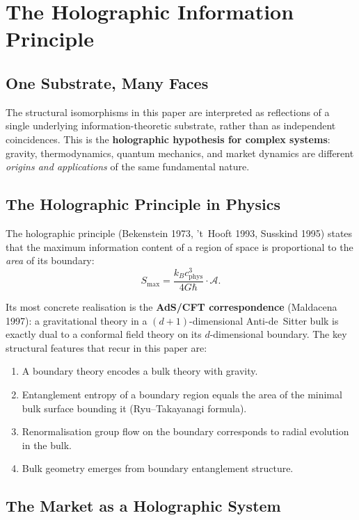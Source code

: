 \documentclass[12pt,a4paper]{article}
\begin{document}
\section{The Holographic Information Principle}

\subsection{One Substrate, Many Faces}

The structural isomorphisms in this paper are interpreted as reflections
of a single underlying information-theoretic substrate, rather than as
independent coincidences. This is the \textbf{holographic hypothesis for
complex systems}: gravity, thermodynamics, quantum mechanics, and market
dynamics are different \emph{origins and applications} of the same
fundamental nature.

\subsection{The Holographic Principle in Physics}

The holographic principle (Bekenstein 1973, 't~Hooft 1993, Susskind 1995)
states that the maximum information content of a region of space is
proportional to the \emph{area} of its boundary:
\begin{equation}
    S_{\max} = \frac{k_B c_{\text{phys}}^3}{4G\hbar}\cdot\mathcal{A}.
\end{equation}

Its most concrete realisation is the \textbf{AdS/CFT correspondence}
(Maldacena 1997): a gravitational theory in a $(d+1)$-dimensional
Anti-de~Sitter bulk is exactly dual to a conformal field theory on its
$d$-dimensional boundary. The key structural features that recur in this
paper are:
\begin{enumerate}
    \item A boundary theory encodes a bulk theory with gravity.
    \item Entanglement entropy of a boundary region equals the area of
          the minimal bulk surface bounding it (Ryu--Takayanagi formula).
    \item Renormalisation group flow on the boundary corresponds to radial
          evolution in the bulk.
    \item Bulk geometry emerges from boundary entanglement structure.
\end{enumerate}

\subsection{The Market as a Holographic System}
\end{document}

